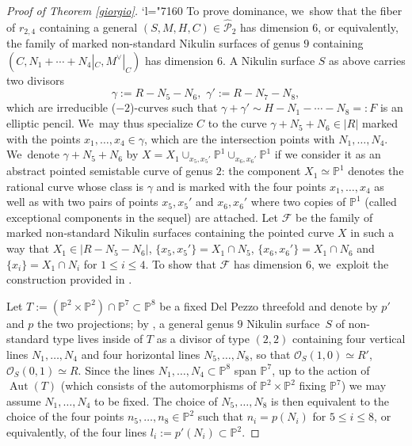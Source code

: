 \documentclass[JEP,XML,SOM,Unicode,NoEqCountersInSection,published]{cedram}
\newcommand{\Changel}{\mathcode`l="7160}
\theoremstyle{plain}
\theoremstyle{definition}
\DeclareMathOperator{\Aut}{Aut}
\newcommand\PP{{\mathbb P}}
\newcommand\F{{\mathcal F}}
\renewcommand\O{{\mathcal O}}
\renewcommand\P{{\mathcal P}}
\begin{document}
\begin{proof}[Proof of Theorem \ref{giorgio}]
\Changel
To prove dominance, we~show that the fiber of $r_{2,4} $ containing a general $(S,M,H,C)\in\widehat\P_{2}$ has dimension $6$, or equivalently, the family of marked non-standard Nikulin surfaces of genus $9$ containing $(C,N_1+\cdots +N_4|_C,M^\vee|_C)$ has dimension $6$. A Nikulin surface $S$ as above carries two divisors\vspace*{-3pt}
\begin{equation*}
\gamma:=R-N_5-N_6,\,\,\gamma':=R-N_7-N_8,
\end{equation*}
which are irreducible ($-2$)-curves such that $\gamma+\gamma'\sim H-N_1-\cdots-N_8=:F$ is an elliptic pencil. We~may thus specialize $C$ to the curve $\gamma+N_5+N_6\in |R|$ marked with the points $x_1,\ldots,x_4\in \gamma$, which are the intersection points with $N_1,\ldots, N_4$. We~denote $\gamma+N_5+N_6$ by $X=X_1\cup_{x_5,x_5'}\PP^1\cup_{x_6,x_6'}\PP^1$ if we consider it as an abstract pointed semistable curve of genus $2$: the component $X_1\simeq\PP^1$ denotes the rational curve whose class is $\gamma$ and is marked with the four points $x_1,\ldots,x_4$ as well as with two pairs of points $x_5,x_5'$ and $x_6,x_6'$ where two copies of $\PP^1$ (called exceptional components in the sequel) are attached. Let $\F$ be the family of marked non-standard Nikulin surfaces containing the pointed curve $X$ in such a way that $X_1\in |R-N_5-N_6|$, $\{x_5,x_5'\}=X_1\cap N_5$, $\{x_6,x_6'\}=X_1\cap N_6$ and $\{x_i\}=X_1\cap N_i$ for $1\leq i\leq 4$. To show that $\F$ has dimension $6$, we~exploit the construction provided in \cite[\S 4]{KLV2}.

Let $T:=(\PP^2\times \PP^2)\cap\PP^7\subset\PP^8$ be a fixed Del Pezzo threefold and denote by $p'$ and $p$ the two projections; by \cite[Prop.\,4.3]{KLV2}, a general genus $9$ Nikulin surface~$S$ of non-standard type lives inside of $T$ as a divisor of type $(2,2)$ containing four vertical lines $N_1,\ldots, N_4$ and four horizontal lines $N_5,\ldots, N_8$, so that $\O_S(1,0)\simeq R'$, $\O_S(0,1)\simeq R$. Since the lines $N_1,\ldots, N_4\subset \PP^8$ span $\PP^7$, up to the action of $\Aut(T)$ (which consists of the automorphisms of $\PP^2\times \PP^2$ fixing $\PP^7$) we may assume $N_1,\ldots, N_4$ to be fixed. The choice of $N_5,\ldots,N_8$ is then equivalent to the choice of the four points $n_5,\ldots, n_8\in \PP^2$ such that $n_i=p(N_i)$ for $5\leq i\leq 8$, or equivalently, of the four lines $l_i:=p'(N_i)\subset\PP^2$.\enlargethispage{.5\baselineskip}%


\end{proof}
\end{document}

